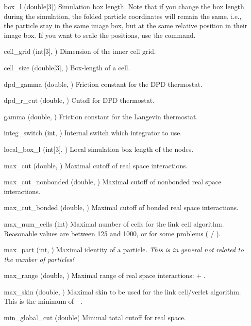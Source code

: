 \begin{globvar}
\item[box_l] (double[3]) Simulation box length. Note that
  if you change the box length during the simulation, the folded
  particle coordinates will remain the same, i.e., the particle stay
  in the same image box, but at the same relative position in their
  image box. If you want to scale the positions, use the
   command.
\item[cell_grid] (int[3], \ro) Dimension of the inner
  cell grid.
\item[cell_size] (double[3], \ro) Box-length of a cell.
\item[dpd_gamma] (double, \ro) Friction constant for the
  DPD thermostat.
\item[dpd_r_cut] (double, \ro) Cutoff for DPD thermostat.
\item[gamma] (double, \ro) Friction constant for the
  Langevin thermostat.
\item[integ_switch] (int, \ro) Internal switch which integrator to
  use.
\item[local_box_l] (int[3], \ro) Local simulation box length of the
  nodes.
\item[max_cut] (double, \ro) Maximal cutoff of real space
  interactions.
\item[max_cut_nonbonded] (double, \ro) Maximal cutoff of nonbonded
  real space interactions.
\item[max_cut_bonded] (double, \ro) Maximal cutoff of bonded
  real space interactions.
\item[max_num_cells] (int) Maximal number of cells for the link cell
  algorithm.  Reasonable values are between 125 and 1000, or for some
  problems ( / ).
\item[max_part] (int, \ro) Maximal identity of a particle.
  \emph{This is in general not related to the number of particles!}
\item[max_range] (double, \ro) Maximal range of real space
  interactions:  + .
\item[max_skin] (double, \ro) Maximal skin to be used for the link
  cell/verlet algorithm. This is the minimum of  -
  .
\item[min_global_cut] (double) Minimal total cutoff for real space.

\end{globvar}
